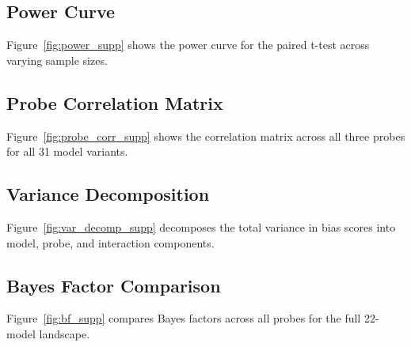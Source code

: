 \documentclass[11pt,twocolumn]{article}
\begin{document}
\subsection{Power Curve}
\label{app:power_curve}
Figure~\ref{fig:power_supp} shows the power curve for the paired t-test across varying sample sizes.


\subsection{Probe Correlation Matrix}
\label{app:probe_correlations}
Figure~\ref{fig:probe_corr_supp} shows the correlation matrix across all three probes for all 31 model variants.


\subsection{Variance Decomposition}
\label{app:variance_decomposition}
Figure~\ref{fig:var_decomp_supp} decomposes the total variance in bias scores into model, probe, and interaction components.


\subsection{Bayes Factor Comparison}
\label{app:bayes_factor}
Figure~\ref{fig:bf_supp} compares Bayes factors across all probes for the full 22-model landscape.
\end{document}
